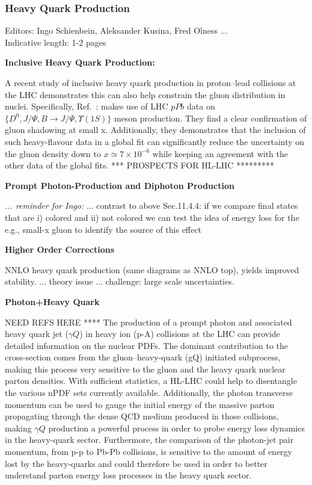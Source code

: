 \documentclass[../report.tex]{subfiles}
\begin{document}
\subsubsection{Heavy Quark Production}
Editors: Ingo Schienbein, Aleksander Kusina, Fred Olness ... \\
Indicative length: 1-2 pages 


\noindent\textbf{Inclusive Heavy Quark Production:} 


A recent study of  inclusive heavy quark
production in proton--lead collisions at the LHC 
demonstrates this can also help constrain  the gluon distribution in nuclei.
%
Specifically, Ref.~:\cite{Kusina:2018pbp} makes use  of LHC $pPb$ data
on $\{D^0, J/\Psi, B\to J/\Psi, \Upsilon(1S)  \}$ meson production. 
They  find a  clear confirmation
of gluon shadowing at small x. Additionally, they  demonstrates that the
inclusion of such heavy-flavour data in a global fit can significantly reduce
the uncertainty on the gluon density down to 
$x \simeq 7 \times 10^{-6}$ while keeping
an agreement with the other data of the global fits. 
%
*** PROSPECTS FOR HL-LHC *********



\noindent\textbf{Prompt Photon-Production and Diphoton Production } 

{\it ... reminder for Ingo:} ... contrast to above Sec.11.4.4: 
if we compare final states that are i) colored and ii) not colored we can test the idea of energy loss
for the e.g., small-x gluon to identify the source of this effect


\noindent\textbf{Higher Order Corrections} 

NNLO heavy quark production (same diagrams as NNLO top), yields improved stability. 
... theory issue ...
challenge: large scale uncertainties. 




\noindent\textbf{Photon+Heavy Quark}

NEED REFS HERE ****\cite{Stavreva:2010mw,Stavreva:2012aa}
%
The production of a prompt photon and associated heavy quark jet ($\gamma Q$) 
in heavy ion (p-A) collisions
at the LHC can provide detailed information on the nuclear PDFs. 
%
The dominant contribution to the cross-section comes from the gluon–heavy-quark (gQ) initiated
subprocess, making this process very sensitive to the gluon and the heavy quark nuclear parton
densities.
%
With sufficient statistics, a HL-LHC could 
help to disentangle the various nPDF sets currently available. 
%
Additionally, the photon transverse momentum can be used to gauge the
initial energy of the massive parton propagating through the dense QCD
medium produced in those collisions, making $\gamma Q$ production a
powerful process in order to probe energy loss dynamics in the
heavy-quark sector.  
%
Furthermore, the comparison of the photon-jet pair momentum, from p-p
to Pb-Pb collisions, is sensitive to the amount of energy lost by the
heavy-quarks and could therefore be used in order to better understand
parton energy loss processes in the heavy quark sector.
\end{document}
